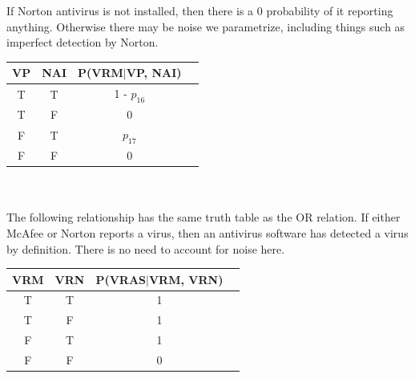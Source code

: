 \documentclass[12pt,letterpaper]{article}
\begin{document}
\begin{enumerate}[label={(\alph*) }]
If Norton antivirus is not installed, then there is a 0 probability of it reporting anything. Otherwise there may be noise we parametrize, including things such as imperfect detection by Norton. \\

\begin{minipage}{0.3\textwidth}
        \begin{tabular}{c c c c} %
        \hline\hline                        %
         VP & NAI & P(VRM$|$VP, NAI) \\ [0.5ex] 
        \hline                  %
        T & T & 1 - $p_{16}$  \\ %
        T & F & 0  \\
        F & T & $p_{17}$  \\
        F & F & 0  \\  
        \hline 
        \end{tabular}

        \end{minipage}\qquad \\ \\ 
        
The following relationship has the same truth table as the OR relation. If either McAfee or Norton reports a virus, then an antivirus software has detected a virus by definition. There is no need to account for noise here. \\

\begin{minipage}{0.3\textwidth}
        \begin{tabular}{c c c c} %
        \hline\hline                        %
         VRM & VRN & P(VRAS$|$VRM, VRN) \\ [0.5ex] 
        \hline                  %
        T & T & 1  \\ %
        T & F & 1  \\
        F & T & 1  \\
        F & F & 0  \\  
        \hline 
        \end{tabular}

        \end{minipage}\qquad \\ \\      
        

\end{enumerate}
\end{document}
